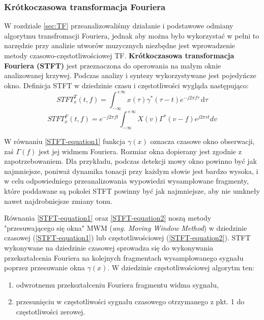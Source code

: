 \documentclass[12pt,a4paper,twoside]{mwart}
\begin{document}
\subsubsection{Krótkoczasowa transformacja Fouriera}\label{sec:STFT}
W rozdziale \ref{sec:TF} przeanalizowaliśmy działanie i podstawowe odmiany algorytmu transfromacji Fouriera, jednak aby można było wykorzystać w pełni to narzędzie przy analizie utworów muzycznych niezbędne jest wprowadzenie metody czasowo-częstotliwościowej TF. \textbf{Krótkoczasowa transformacja Fouriera (STFT)} jest przeznaczona do operowania na małym oknie analizowanej krzywej. Podczas analizy i syntezy wykorzystywane jest pojedyńcze okno. Definicja STFT w dziedzinie czasu i częstotliwości wygląda następująco:
\begin{equation} \label{STFT-equation1}
  STFT^{T}_{x}(t,f) =\int_{-\infty}^{+\infty} x(\tau)\gamma^{*}(\tau - t)e^{-j2\pi f\tau}  \,\mathrm{d}\tau
\end{equation}
\begin{equation} \label{STFT-equation2}
  STFT^{F}_{x}(t,f) = e^{-j2\pi ft} \int_{-\infty}^{+\infty} X(v) \Gamma^{*} (v-f) e^{j2\pi vt} {d}v
\end{equation}

W równaniu \ref{STFT-equation1} funkcja $\gamma(x)$ oznacza czasowe okno obserwacji, zaś $\Gamma(f)$ jest jej widmem Fouriera. Rozmiar okna dopierany jest zgodnie z zapotrzebowaniem. Dla przykładu, podczas detekcji mowy okno powinno być jak najmniejsze, poniważ dynamika tonacji przy każdym słowie jest bardzo wysoka, i w celu odpowiedniego przeanalizowania wypowiedzi wysamplowane fragmenty, które poddawane są pokolei STFT powinny być jak najmniejsze, aby nie umkneły nawet najdrobniejsze zmiany tonu\cite{MultipleFundamentalFrequencyEstimation}.

Równania \ref{STFT-equation1} oraz \ref{STFT-equation2} noszą metody "przesuwającego się okna" MWM (\textit{ang. Moving Window Method}) w dziedzinie czasowej (\ref{STFT-equation1}) lub częstotliwościowej (\ref{STFT-equation2}). STFT wykonywane na dziedzinie czasowej sprowadza się do wykonywania przekształcenia Fouriera na kolejnych fragmentach wysamplowanego sygnału poprzez przesuwanie okna $\gamma(x)$. W dziedzinie częstotliwościowej algorytm ten:
\begin{enumerate}
  \item odwrotnemu przekształceniu Fouriera fragmentu widma sygnału,
  \item przesunięciu w częstotliwości sygnału czasowego otrzymanego z pkt. 1 do częstotliwości zerowej.
\end{enumerate}
\cite[455-458]{CyfrowePrzetwarzanieSygnalowOdTeoriiDoZastosowan}
\end{document}
